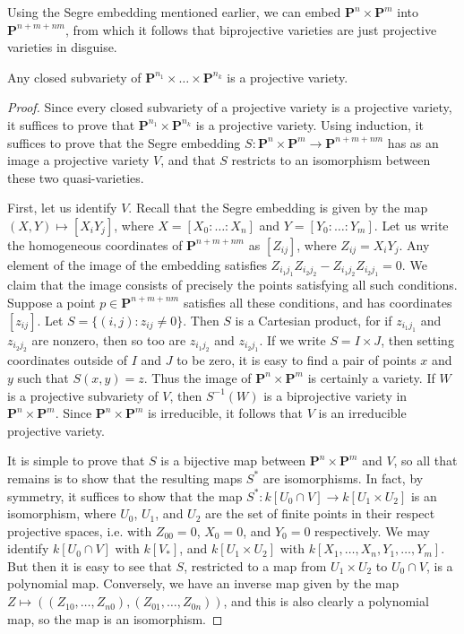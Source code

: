 Using the Segre embedding mentioned earlier, we can embed $\mathbf{P}^n \times \mathbf{P}^m$ into $\mathbf{P}^{n + m + nm}$, from which it follows that biprojective varieties are just projective varieties in disguise.

\begin{theorem}
    Any closed subvariety of $\mathbf{P}^{n_1} \times \dots \times \mathbf{P}^{n_k}$ is a projective variety.
\end{theorem}
\begin{proof}
    Since every closed subvariety of a projective variety is a projective variety, it suffices to prove that $\mathbf{P}^{n_1} \times \mathbf{P}^{n_k}$ is a projective variety. Using induction, it suffices to prove that the Segre embedding $S: \mathbf{P}^n \times \mathbf{P}^m \to \mathbf{P}^{n+m+nm}$ has as an image a projective variety $V$, and that $S$ restricts to an isomorphism between these two quasi-varieties.

    First, let us identify $V$. Recall that the Segre embedding is given by the map $(X,Y) \mapsto [X_iY_j]$, where $X = [X_0:\dots:X_n]$ and $Y=[Y_0:\dots:Y_m]$. Let us write the homogeneous coordinates of $\mathbf{P}^{n+m+nm}$ as $[Z_{ij}]$, where $Z_{ij} = X_iY_j$. Any element of the image of the embedding satisfies $Z_{i_1j_1} Z_{i_2j_2} - Z_{i_1j_2} Z_{i_2j_1} = 0$. We claim that the image consists of precisely the points satisfying all such conditions. Suppose a point $p \in \mathbf{P}^{n+m+nm}$ satisfies all these conditions, and has coordinates $[z_{ij}]$. Let $S = \{ (i,j) : z_{ij} \neq 0 \}$. Then $S$ is a Cartesian product, for if $z_{i_1j_1}$ and $z_{i_2j_2}$ are nonzero, then so too are $z_{i_1j_2}$ and $z_{i_2j_1}$. If we write $S = I \times J$, then setting coordinates outside of $I$ and $J$ to be zero, it is easy to find a pair of points $x$ and $y$ such that $S(x,y) = z$. Thus the image of $\mathbf{P}^n \times \mathbf{P}^m$ is certainly a variety. If $W$ is a projective subvariety of $V$, then $S^{-1}(W)$ is a biprojective variety in $\mathbf{P}^n \times \mathbf{P}^m$. Since $\mathbf{P}^n \times \mathbf{P}^m$ is irreducible, it follows that $V$ is an irreducible projective variety.

    It is simple to prove that $S$ is a bijective map between $\mathbf{P}^n \times \mathbf{P}^m$ and $V$, so all that remains is to show that the resulting maps $S^*$ are isomorphisms. In fact, by symmetry, it suffices to show that the map $S^*: k[U_0 \cap V] \to k[U_1 \times U_2]$ is an isomorphism, where $U_0$, $U_1$, and $U_2$ are the set of finite points in their respect projective spaces, i.e. with $Z_{00} = 0$, $X_0 = 0$, and $Y_0 = 0$ respectively. We may identify $k[U_0 \cap V]$ with $k[V_*]$, and $k[U_1 \times U_2]$ with $k[X_1,\dots,X_n,Y_1,\dots,Y_m]$. But then it is easy to see that $S$, restricted to a map from $U_1 \times U_2$ to $U_0 \cap V$, is a polynomial map. Conversely, we have an inverse map given by the map $Z \mapsto ((Z_{10},\dots,Z_{n0}),(Z_{01},\dots,Z_{0n}))$, and this is also clearly a polynomial map, so the map is an isomorphism.
\end{proof}

